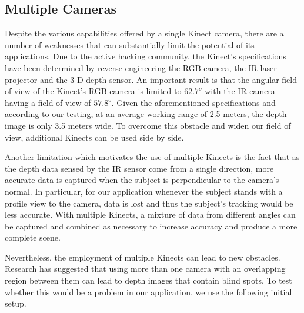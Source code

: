 \documentclass[10pt,a4paper]{article}
\begin{document}
\subsection{Multiple Cameras}
\noindent
Despite the various capabilities offered by a single Kinect camera, there are a number of weaknesses that can substantially limit the potential of its applications. Due to the active hacking community, the Kinect's specifications have been determined by reverse engineering the RGB camera, the IR laser projector and the 3-D depth sensor. An important result is that the angular field of view of the Kinect's RGB camera is limited to $62.7^o$ with the IR camera having a field of view of $57.8^o$. Given the aforementioned specifications and according to our testing, at an average working range of 2.5 meters, the depth image is only 3.5 meters wide. To overcome this obstacle and widen our field of view, additional Kinects can be used side by side. 
 
\noindent
Another limitation which motivates the use of multiple Kinects is the fact that as the depth data sensed by the IR sensor come from a single direction, more accurate data is captured when the subject is perpendicular to the camera's normal. In particular, for our application whenever the subject stands with a profile view to the camera, data is lost and thus the subject's tracking would be less accurate. With multiple Kinects, a mixture of data from different angles can be captured and combined as necessary to increase accuracy and produce a more complete scene.
 
\noindent
Nevertheless, the employment of multiple Kinects can lead to new obstacles. Research has suggested that using more than one camera with an overlapping region between them can lead to depth images that contain blind spots. To test whether this would be a problem in our application, we use the following initial setup.
\end{document}
